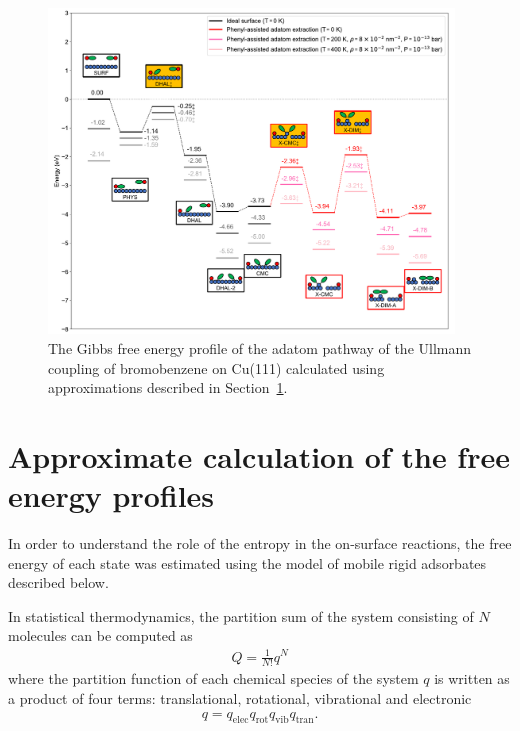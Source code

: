 \documentclass[journal=jpclcd,layout=traditional,manuscript=letter]{achemso} %
\begin{document}
\begin{figure}[bt]
\centering
\includegraphics[width=0.96\textwidth]{Fig/Entropy_adatom.pdf}
\caption{The Gibbs free energy profile of the adatom pathway of the Ullmann coupling of bromobenzene on Cu(111) calculated using approximations described in Section~\ref{sec:free-en}.} 
\label{fig:entropy_adatom}
\end{figure}

\section{Approximate calculation of the free energy profiles} \label{sec:free-en}

In order to understand the role of the entropy in the on-surface reactions, the free energy of each state was estimated using the model of mobile rigid adsorbates~\cite{ullmann_174} described below.

In statistical thermodynamics, the partition sum of the system consisting of $N$ molecules can be computed as
%
\begin{equation}
\begin{split}
Q = \frac{1}{N!} q^{N}
\end{split}
\end{equation}
%
where the partition function of each chemical species of the system $q$ is written as a product of four terms: translational, rotational, vibrational and electronic
%
\begin{equation}
\begin{split}
q = q_{\text{elec}} q_{{\text{rot}}} q_{\text{vib}} q_{\text{tran}}.
\end{split}
\end{equation}
%
\end{document}
